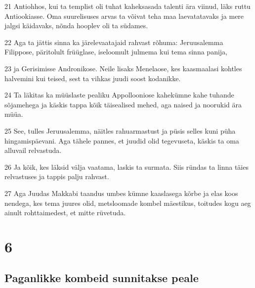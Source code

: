 \par 21 Antiohhos, kui ta templist oli tuhat kaheksasada talenti ära viinud, läks ruttu Antiookiasse. Oma suurelisuses arvas ta võivat teha maa laevatatavaks ja mere jalgsi käidavaks, nõnda hooplev oli ta südames.
\par 22 Aga ta jättis sinna ka järelevaatajaid rahvast rõhuma: Jeruusalemma Filippose, päritolult früüglase, iseloomult julmema kui tema sinna panija,
\par 23 ja Gerisimisse Andronikose. Neile lisaks Menelaose, kes kaasmaalasi kohtles halvemini kui teised, sest ta vihkas juudi soost kodanikke.
\par 24 Ta läkitas ka müüslaste pealiku Appollooniose kahekümne kahe tuhande sõjamehega ja käskis tappa kõik täisealised mehed, aga naised ja noorukid ära müüa.
\par 25 See, tulles Jeruusalemma, näitles rahuarmastust ja püsis selles kuni püha hingamispäevani. Aga tähele pannes, et juudid olid tegevuseta, käskis ta oma alluvail relvastuda.
\par 26 Ja kõik, kes läksid välja vaatama, laskis ta surmata. Siis ründas ta linna täies relvastuses ja tappis palju rahvast.
\par 27 Aga Juudas Makkabi taandus umbes kümne kaaslasega kõrbe ja elas koos nendega, kes tema juures olid, metsloomade kombel mäestikus, toitudes kogu aeg ainult rohttaimedest, et mitte rüvetuda.



\chapter{6}


\section*{Paganlikke kombeid sunnitakse peale}

